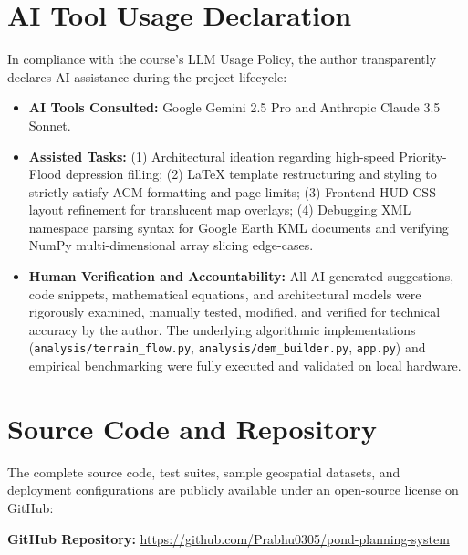 \documentclass[manuscript,screen,review]{acmart}
\begin{document}
\section{AI Tool Usage Declaration}
\label{sec:ai-usage}
In compliance with the course's LLM Usage Policy, the author transparently declares AI assistance during the project lifecycle:
\begin{itemize}
    \item \textbf{AI Tools Consulted:} Google Gemini 2.5 Pro and Anthropic Claude 3.5 Sonnet.
    \item \textbf{Assisted Tasks:} (1) Architectural ideation regarding high-speed Priority-Flood depression filling; (2) LaTeX template restructuring and styling to strictly satisfy ACM formatting and page limits; (3) Frontend HUD CSS layout refinement for translucent map overlays; (4) Debugging XML namespace parsing syntax for Google Earth KML documents and verifying NumPy multi-dimensional array slicing edge-cases.
    \item \textbf{Human Verification and Accountability:} All AI-generated suggestions, code snippets, mathematical equations, and architectural models were rigorously examined, manually tested, modified, and verified for technical accuracy by the author. The underlying algorithmic implementations (\texttt{analysis/terrain\_flow.py}, \texttt{analysis/dem\_builder.py}, \texttt{app.py}) and empirical benchmarking were fully executed and validated on local hardware.
\end{itemize}

\appendix

\section{Source Code and Repository}
\label{sec:repo}
The complete source code, test suites, sample geospatial datasets, and deployment configurations are publicly available under an open-source license on GitHub:
\begin{center}
    \textbf{GitHub Repository:} \url{https://github.com/Prabhu0305/pond-planning-system}
\end{center}
\end{document}

